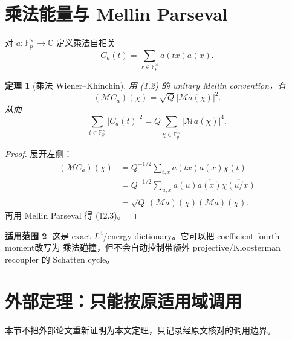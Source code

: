\documentclass[11pt,a4paper]{ctexart}
\newtheorem{theorem}{定理}[section]
\theoremstyle{definition}
\newtheorem{remark}[theorem]{适用范围}
\newcommand{\F}{\mathbb F}
\newcommand{\C}{\mathbb C}
\newcommand{\G}{\F_p^\times}
\newcommand{\Gh}{\widehat{\G}}
\newcommand{\1}{\mathbf 1}
\begin{document}
\section{乘法能量与 Mellin Parseval}

对 $a:\G\to\C$ 定义乘法自相关
\[
C_a(t)=\sum_{x\in\G}a(tx)\overline{a(x)}.
\tag{12.1}
\]

\begin{theorem}[乘法 Wiener--Khinchin]
用 (1.2) 的 unitary Mellin convention，有
\[
\boxed{
(\mathcal M C_a)(\chi)=\sqrt Q\,|\mathcal Ma(\chi)|^2.}
\tag{12.2}
\]
从而
\[
\boxed{
\sum_{t\in\G}|C_a(t)|^2
=Q\sum_{\chi\in\Gh}|\mathcal Ma(\chi)|^4.}
\tag{12.3}
\]
\end{theorem}

\begin{proof}
展开左侧：
\begin{align*}
(\mathcal MC_a)(\chi)
&=Q^{-1/2}\sum_{t,x}a(tx)\overline{a(x)}\overline{\chi(t)}\\
&=Q^{-1/2}\sum_{u,x}a(u)\overline{a(x)}
\overline{\chi(u/x)}\\
&=\sqrt Q\,(\mathcal Ma)(\chi)\overline{(\mathcal Ma)(\chi)}.
\end{align*}
再用 Mellin Parseval 得 (12.3)。
\end{proof}

\begin{remark}
这是 exact $L^4$/energy dictionary。它可以把 coefficient fourth moment改写为
乘法碰撞，但不会自动控制带额外 projective/Kloosterman recoupler 的 Schatten cycle。
\end{remark}

\section{外部定理：只能按原适用域调用}

本节不把外部论文重新证明为本文定理，只记录经原文核对的调用边界。
\end{document}
